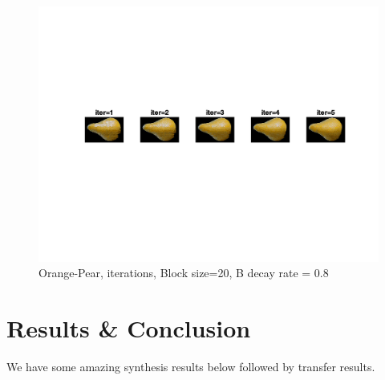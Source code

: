 \documentclass[10pt,twocolumn,letterpaper]{article}
\begin{document}
\begin{figure}[h]
    \begin{center}
    \includegraphics[trim={2cm 6cm 2cm 4cm}, clip, scale=0.9]{../results/iters/res_orange_pear_b_20_bdr_0_800000.png}
    \end{center}
    \vspace{-0.2em}
    \caption{Orange-Pear, iterations, Block size=20, B decay rate = 0.8}
    \label{fig:or_pear_iter}
\end{figure}


\section{Results \& Conclusion}
We have some amazing synthesis results below followed by transfer results.
\end{document}
